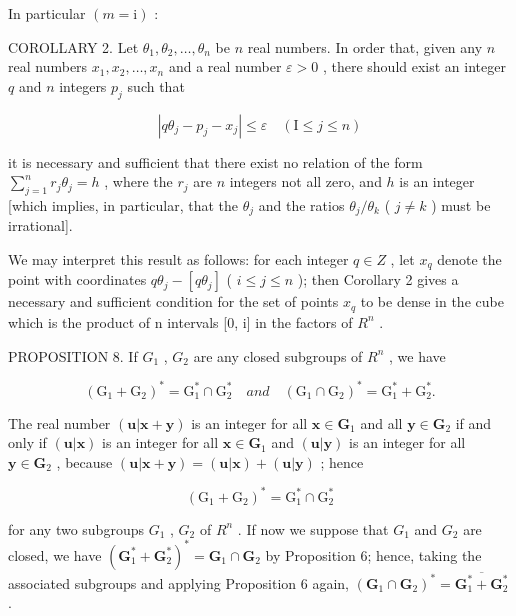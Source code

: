 In particular \((m = \mathrm{i})\) :

COROLLARY 2. Let \(\theta_{1},\theta_{2},\ldots ,\theta_{n}\) be \(n\) real numbers. In order that, given any \(n\) real numbers \(x_{1},x_{2},\ldots ,x_{n}\) and a real number \(\varepsilon >0\) , there should exist an integer \(q\) and \(n\) integers \(p_j\) such that

\[
\left| q \theta_ {j} - p _ {j} - x _ {j} \right| \leqslant \varepsilon \quad (\mathrm{I} \leqslant j \leqslant n)
\]

it is necessary and sufficient that there exist no relation of the form \(\sum_{j=1}^{n} r_j \theta_j = h\) , where the \(r_j\) are \(n\) integers not all zero, and \(h\) is an integer {[}which implies, in particular, that the \(\theta_j\) and the ratios \(\theta_j / \theta_k\) ( \(j \neq k\) ) must be irrational{]}.

We may interpret this result as follows: for each integer \(q \in Z\) , let \(x_{q}\) denote the point with coordinates \(q\theta_{j} - [q\theta_{j}]\) ( \(i \leqslant j \leqslant n\) ); then Corollary 2 gives a necessary and sufficient condition for the set of points \(x_{q}\) to be dense in the cube which is the product of n intervals {[}0, i{]} in the factors of \(R^{n}\) .

PROPOSITION 8. If \(G_{1}\) , \(G_{2}\) are any closed subgroups of \(R^{n}\) , we have

\[
(\mathrm{G} _ {1} + \mathrm{G} _ {2}) ^ {*} = \mathrm{G} _ {1} ^ {*} \cap \mathrm{G} _ {2} ^ {*} \quad a n d \quad (\mathrm{G} _ {1} \cap \mathrm{G} _ {2}) ^ {*} = \mathrm{G} _ {1} ^ {*} + \mathrm{G} _ {2} ^ {*}.
\]

The real number \((\pmb{u}|\pmb{x} + \pmb{y})\) is an integer for all \(\pmb{x} \in \mathbf{G}_1\) and all \(\pmb{y} \in \mathbf{G}_2\) if and only if \((\pmb{u}|\pmb{x})\) is an integer for all \(\pmb{x} \in \mathbf{G}_1\) and \((\pmb{u}|\pmb{y})\) is an integer for all \(\pmb{y} \in \mathbf{G}_2\) , because \((\pmb{u}|\pmb{x} + \pmb{y}) = (\pmb{u}|\pmb{x}) + (\pmb{u}|\pmb{y})\) ; hence

\[
(\mathrm{G} _ {1} + \mathrm{G} _ {2}) ^ {*} = \mathrm{G} _ {1} ^ {*} \cap \mathrm{G} _ {2} ^ {*}
\]

for any two subgroups \(G_{1}\) , \(G_{2}\) of \(R^{n}\) . If now we suppose that \(G_{1}\) and \(G_{2}\) are closed, we have \((\mathbf{G}_{1}^{*} + \mathbf{G}_{2}^{*})^{*} = \mathbf{G}_{1} \cap \mathbf{G}_{2}\) by Proposition 6; hence, taking the associated subgroups and applying Proposition 6 again, \((\mathbf{G}_{1} \cap \mathbf{G}_{2})^{*} = \overline{\mathbf{G}_{1}^{*} + \mathbf{G}_{2}^{*}}\) .

